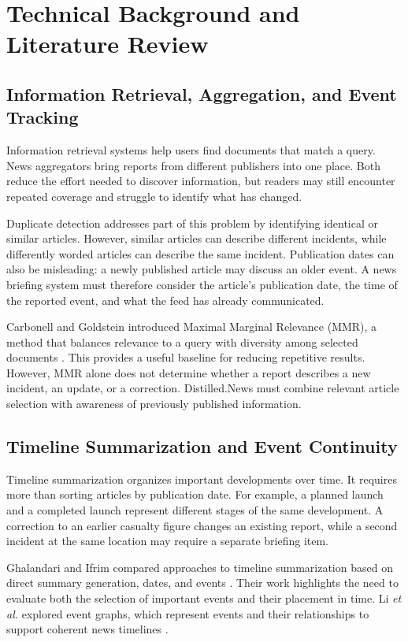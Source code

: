 \chapter{Technical Background and Literature Review}
\label{chap:background}

\section{Information Retrieval, Aggregation, and Event Tracking}

Information retrieval systems help users find documents that match a query. News aggregators bring reports from different publishers into one place. Both reduce the effort needed to discover information, but readers may still encounter repeated coverage and struggle to identify what has changed.

Duplicate detection addresses part of this problem by identifying identical or similar articles. However, similar articles can describe different incidents, while differently worded articles can describe the same incident. Publication dates can also be misleading: a newly published article may discuss an older event. A news briefing system must therefore consider the article's publication date, the time of the reported event, and what the feed has already communicated.

Carbonell and Goldstein introduced Maximal Marginal Relevance (MMR), a method that balances relevance to a query with diversity among selected documents \cite{carbonell1998}. This provides a useful baseline for reducing repetitive results. However, MMR alone does not determine whether a report describes a new incident, an update, or a correction. Distilled.News must combine relevant article selection with awareness of previously published information.

\section{Timeline Summarization and Event Continuity}

Timeline summarization organizes important developments over time. It requires more than sorting articles by publication date. For example, a planned launch and a completed launch represent different stages of the same development. A correction to an earlier casualty figure changes an existing report, while a second incident at the same location may require a separate briefing item.

Ghalandari and Ifrim compared approaches to timeline summarization based on direct summary generation, dates, and events \cite{ghalandari2020}. Their work highlights the need to evaluate both the selection of important events and their placement in time. Li \textit{et al.} explored event graphs, which represent events and their relationships to support coherent news timelines \cite{li2021}.

